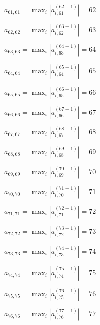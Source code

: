 \documentclass[a4paper,12pt]{article}
\begin{document}
$a _{ 61, 61 } =  \max _i |a _{ i, 61 } ^{ (62 - 1) } | = 62$

$a _{ 62, 62 } =  \max _i |a _{ i, 62 } ^{ (63 - 1) } | = 63$

$a _{ 63, 63 } =  \max _i |a _{ i, 63 } ^{ (64 - 1) } | = 64$

$a _{ 64, 64 } =  \max _i |a _{ i, 64 } ^{ (65 - 1) } | = 65$

$a _{ 65, 65 } =  \max _i |a _{ i, 65 } ^{ (66 - 1) } | = 66$

$a _{ 66, 66 } =  \max _i |a _{ i, 66 } ^{ (67 - 1) } | = 67$

$a _{ 67, 67 } =  \max _i |a _{ i, 67 } ^{ (68 - 1) } | = 68$

$a _{ 68, 68 } =  \max _i |a _{ i, 68 } ^{ (69 - 1) } | = 69$

$a _{ 69, 69 } =  \max _i |a _{ i, 69 } ^{ (70 - 1) } | = 70$

$a _{ 70, 70 } =  \max _i |a _{ i, 70 } ^{ (71 - 1) } | = 71$

$a _{ 71, 71 } =  \max _i |a _{ i, 71 } ^{ (72 - 1) } | = 72$

$a _{ 72, 72 } =  \max _i |a _{ i, 72 } ^{ (73 - 1) } | = 73$

$a _{ 73, 73 } =  \max _i |a _{ i, 73 } ^{ (74 - 1) } | = 74$

$a _{ 74, 74 } =  \max _i |a _{ i, 74 } ^{ (75 - 1) } | = 75$

$a _{ 75, 75 } =  \max _i |a _{ i, 75 } ^{ (76 - 1) } | = 76$

$a _{ 76, 76 } =  \max _i |a _{ i, 76 } ^{ (77 - 1) } | = 77$
\end{document}
